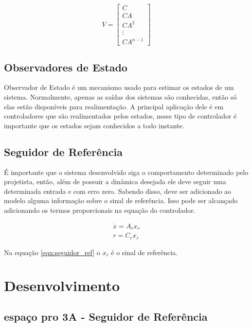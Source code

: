 \documentclass[
	12pt,				%
	openany,			%
	oneside,			%
	a4paper,			%
	english,			%
	french,				%
	spanish,			%
	brazil,				%
	]{abntex2}
\begin{document}
{\begin{equation}
V =
\begin{bmatrix}
	C\\
	CA\\
	CA^2\\
	\vdots \\
	CA^{n-1}
\end{bmatrix}
\end{equation}

\section{Observadores de Estado}

Observador de Estado é um mecanismo usado para estimar os estados de um sistema. Normalmente, apenas as saídas dos sistemas são conhecidas, então só elas estão disponíveis para realimentação. A principal aplicação dele é em controladores que são realimentados pelos estados, nesse tipo de controlador é importante que os estados sejam conhecidos a todo instante.

\section{Seguidor de Referência}

É importante que o sistema desenvolvido siga o comportamento determinado pelo projetista, então, além de possuir a dinâmica desejada ele deve seguir uma determinada entrada e com erro zero. Sabendo disso, deve ser adicionado ao modelo alguma informação sobre o sinal de referência. Isso pode ser alcançado adicionando os termos proporcionais na equação do controlador. 

\begin{equation}
	\begin{split}
	\dot{x} = A_r x_r \\ 
    r = C_r x_r
	\end{split}
\label{eqn:seguidor_ref}
\end{equation}

Na equação \ref{eqn:seguidor_ref} o $x_r$ é o sinal de referência.

\chapter{Desenvolvimento}

\section{espaço pro 3A - Seguidor de Referência}

}
\end{document}
